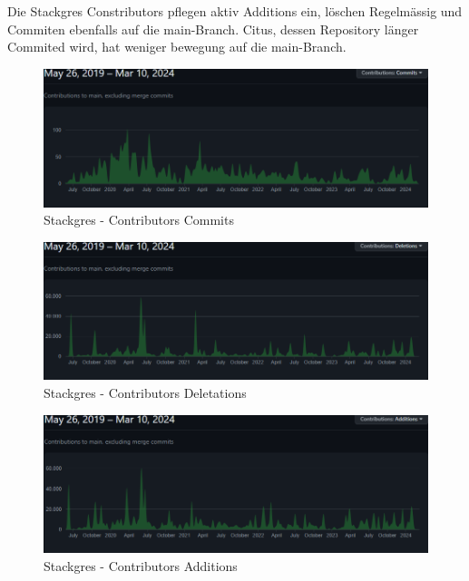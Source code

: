 \begin{flushleft}
    Die Stackgres Constributors pflegen aktiv Additions ein, löschen Regelmässig und Commiten ebenfalls auf die main-Branch.
    Citus, dessen Repository länger Commited wird, hat weniger bewegung auf die main-Branch.
    \begin{figure}[H]
        \centering
        \includegraphics[width=0.75\linewidth]{source/implementation/evaluation/postgresql_ha_solutions/insights/stackgres_citus/contributors_commits_ongres_stackgres}
        \caption{Stackgres - Contributors Commits}
        \label{fig:contributors_commits_ongres_stackgres}
    \end{figure}
    \begin{figure}[H]
        \centering
        \includegraphics[width=0.75\linewidth]{source/implementation/evaluation/postgresql_ha_solutions/insights/stackgres_citus/contributors_deletations_ongres_stackgres}
        \caption{Stackgres - Contributors Deletations}
        \label{fig:contributors_deletations_ongres_stackgres}
    \end{figure}
    \begin{figure}[H]
        \centering
        \includegraphics[width=0.75\linewidth]{source/implementation/evaluation/postgresql_ha_solutions/insights/stackgres_citus/contributors_addition_ongres_stackgres}
        \caption{Stackgres - Contributors Additions}
        \label{fig:contributors_addition_ongres_stackgres}
    \end{figure}

\end{flushleft}
